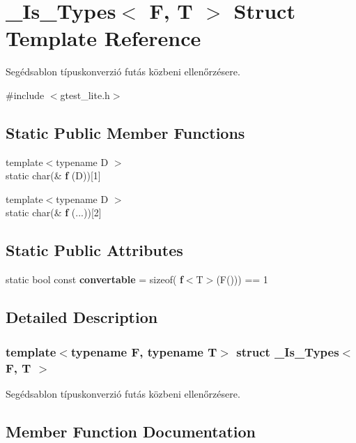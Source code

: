 \section{\+\_\+\+Is\+\_\+\+Types$<$ F, T $>$ Struct Template Reference}
\label{struct___is___types}


Segédsablon típuskonverzió futás közbeni ellenőrzésere.  




{\ttfamily \#include $<$gtest\+\_\+lite.\+h$>$}

\subsection*{Static Public Member Functions}
\begin{DoxyCompactItemize}
\item 
{\footnotesize template$<$typename D $>$ }\\static char(\& \textbf{ f} (D))[1]
\item 
{\footnotesize template$<$typename D $>$ }\\static char(\& \textbf{ f} (...))[2]
\end{DoxyCompactItemize}
\subsection*{Static Public Attributes}
\begin{DoxyCompactItemize}
\item 
static bool const \textbf{ convertable} = sizeof(\textbf{ f}$<$T$>$(F())) == 1
\end{DoxyCompactItemize}


\subsection{Detailed Description}
\subsubsection*{template$<$typename F, typename T$>$\newline
struct \+\_\+\+Is\+\_\+\+Types$<$ F, T $>$}

Segédsablon típuskonverzió futás közbeni ellenőrzésere. 

\subsection{Member Function Documentation}
\mbox{\label{struct___is___types_a56e08a2768c571caab81e9bc47d5acc6}} 
